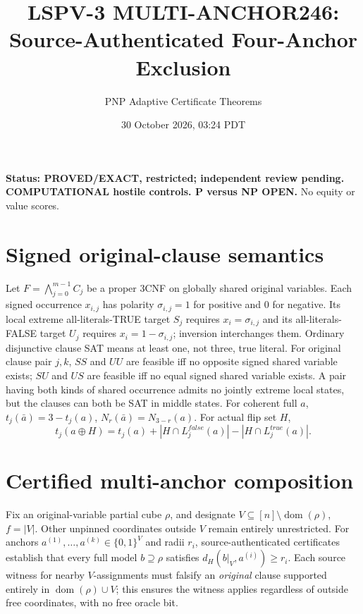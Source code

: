 \documentclass[10pt]{article}
\title{LSPV-3 MULTI-ANCHOR246: Source-Authenticated Four-Anchor Exclusion}
\author{PNP Adaptive Certificate Theorems}
\date{30 October 2026, 03:24 PDT}
\begin{document}
\maketitle
\noindent\textbf{Status: PROVED/EXACT, restricted; independent review pending.
COMPUTATIONAL hostile controls. P versus NP OPEN.} No equity or value scores.

\section{Signed original-clause semantics}
Let $F=\bigwedge_{j=0}^{m-1}C_j$ be a proper 3CNF on globally shared original variables.
Each signed occurrence $x_{i,j}$ has polarity $\sigma_{i,j}=1$ for positive
and $0$ for negative. Its local extreme all-literals-TRUE target $S_j$
requires $x_i=\sigma_{i,j}$ and its all-literals-FALSE target $U_j$
requires $x_i=1-\sigma_{i,j}$; inversion interchanges them.
Ordinary disjunctive clause SAT means at least one, not three, true literal.
For original clause pair $j,k$, $SS$ and $UU$ are feasible iff no opposite
signed shared variable exists; $SU$ and $US$ are feasible iff no equal
signed shared variable exists. A pair having both kinds of shared occurrence
admits no jointly extreme local states, but the clauses can both be SAT in
middle states. For coherent full $a$, $t_j(\bar a)=3-t_j(a)$,
$N_r(\bar a)=N_{3-r}(a)$. For actual flip set $H$,
\[
t_j(a\oplus H)=t_j(a)+|H\cap L_j^{false}(a)|-|H\cap L_j^{true}(a)|.
\]

\section{Certified multi-anchor composition}
Fix an original-variable partial cube $\rho$, and designate
$V\subseteq[n]\setminus\operatorname{dom}(\rho)$, $f=|V|$.
Other unpinned coordinates outside $V$ remain entirely unrestricted.
For anchors $a^{(1)},\dots,a^{(k)}\in\{0,1\}^V$ and radii $r_i$,
source-authenticated certificates establish that every full model
$b\supseteq\rho$ satisfies
$d_H(b|_V,a^{(i)})\ge r_i$.
Each source witness for nearby $V$-assignments must falsify an
\emph{original} clause supported entirely in
$\operatorname{dom}(\rho)\cup V$; this ensures the witness applies
regardless of outside free coordinates, with no free oracle bit.
\end{document}
